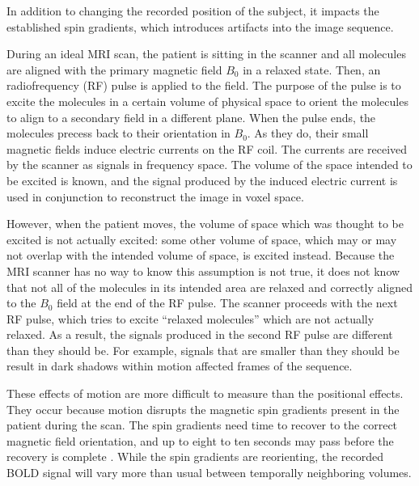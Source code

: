 In addition to changing the recorded position of the subject, it impacts the established spin gradients, which introduces artifacts into the image sequence.


During an ideal MRI scan, the patient is sitting in the scanner and all molecules are aligned with the primary magnetic field $B_0$ in a relaxed state. Then, an radiofrequency (RF) pulse is applied to the field. The purpose of the pulse is to excite the molecules in a certain volume of physical space to orient the molecules to align to a secondary field in a different plane. When the pulse ends, the molecules precess back to their orientation in $B_0$. As they do, their small magnetic fields induce electric currents on the RF coil. The currents are received by the scanner as signals in frequency space. The volume of the space intended to be excited is known, and the signal produced by the induced electric current is used in conjunction to reconstruct the image in voxel space.

However, when the patient moves, the volume of space which was thought to be excited is not actually excited: some other volume of space, which may or may not overlap with the intended volume of space, is excited instead. Because the MRI scanner has no way to know this assumption is not true, it does not know that not all of the molecules in its intended area are relaxed and correctly aligned to the $B_0$ field at the end of the RF pulse. The scanner proceeds with the next RF pulse, which tries to excite ``relaxed molecules'' which are not actually relaxed. As a result, the signals produced in the second RF pulse are different than they should be. For example, signals that are smaller than they should be result in dark shadows within motion affected frames of the sequence.

These effects of motion are more difficult to measure than the positional effects. They occur because motion disrupts the magnetic spin gradients present in the patient during the scan. The spin gradients need time to recover to the correct magnetic field orientation, and up to eight to ten seconds may pass before the recovery is complete \cite{Power2014}. While the spin gradients are reorienting, the recorded BOLD signal will vary more than usual between temporally neighboring volumes. 


